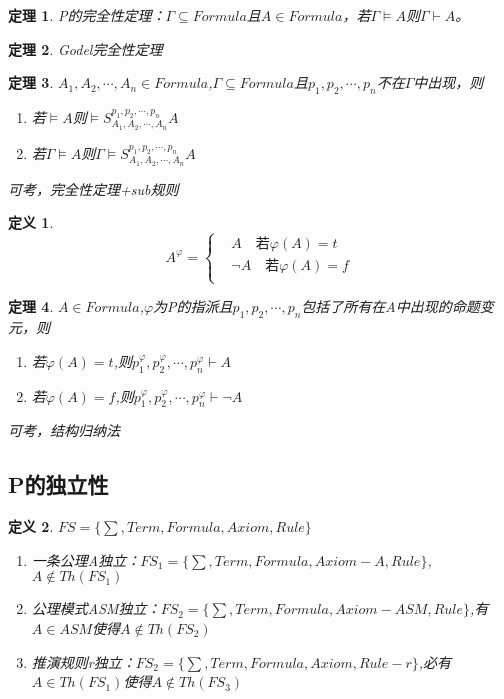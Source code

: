 \documentclass[a4paper]{ctexart}
\newtheorem{thm}{\hspace{2em}定理}[subsection]
\newtheorem{defi}{\hspace{2em}定义}[subsection]
\newcommand{\shade}[1]{\colorbox{shadecolor}{#1}}
\begin{document}
\begin{thm}
  P的完全性定理：$\Gamma\subseteq Formula$且$A\in Formula$，若$\Gamma\models A$则$\Gamma\vdash A$。
\end{thm}

\begin{thm}
  Godel完全性定理
\end{thm}

\begin{thm}
  $A_1,A_2,\cdots,A_n\in Formula$,$\Gamma\subseteq Formula$且$p_1,p_2,\cdots,p_n$不在$\Gamma$中出现，则
  \begin{enumerate}[itemindent=2em]
    \item 若$\models A$则$\models S_{A_1,A_2,\cdots,A_n}^{p_1,p_2,\cdots,p_n}A$
    \item 若$\Gamma\models A$则$\Gamma\models S_{A_1,A_2,\cdots,A_n}^{p_1,p_2,\cdots,p_n}A$
  \end{enumerate}
  \shade{可考，完全性定理+sub规则}
\end{thm}

\begin{defi}
  $$A^\varphi=\left\{\begin{aligned}
    &A\quad\text{若}\varphi(A)=t\\
    &\neg A\quad\text{若}\varphi(A)=f\\
  \end{aligned}\right.
  $$
\end{defi}

\begin{thm}
  $A\in Formula$,$\varphi$为P的指派且$p_1,p_2,\cdots,p_n$包括了所有在A中出现的命题变元，则
  \begin{enumerate}[itemindent=2em]
    \item 若$\varphi(A)=t$,则$p_1^\varphi,p_2^\varphi,\cdots,p_n^\varphi\vdash A$
    \item 若$\varphi(A)=f$,则$p_1^\varphi,p_2^\varphi,\cdots,p_n^\varphi\vdash \neg A$
  \end{enumerate}
  \shade{可考，结构归纳法}
\end{thm}

\subsection{P的独立性}
\begin{defi}
  $FS=\{\sum,Term,Formula,Axiom,Rule\}$
  \begin{enumerate}[itemindent=2em]
    \item 一条公理A独立：$FS_1=\{\sum,Term,Formula,Axiom-A,Rule\}$,$A\not\in Th(FS_1)$
    \item 公理模式ASM独立：$FS_2=\{\sum,Term,Formula,Axiom-ASM,Rule\}$,有$A\in ASM$使得$A\not\in Th(FS_2)$
    \item 推演规则r独立：$FS_2=\{\sum,Term,Formula,Axiom,Rule-r\}$,必有$A\in Th(FS_1)$使得$A\not\in Th(FS_3)$
  \end{enumerate}
\end{defi}
\end{document}
